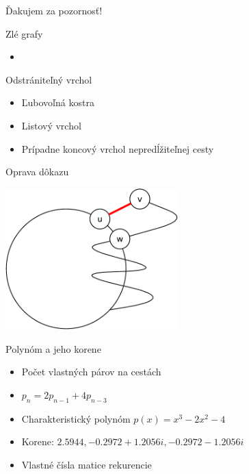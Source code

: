 \documentclass[slovak]{beamer}
\begin{document}
\begin{frame}[plain,c]

\begin{center}
\Huge Ďakujem za pozornosť!
\end{center}

\end{frame}

\appendix

\begin{frame}{Zlé grafy}
    \begin{itemize}
        \item
    \end{itemize}
\end{frame}

\begin{frame}{Odstrániteľný vrchol}
    \begin{itemize}
        \item Ľubovoľná kostra
        \item Listový vrchol
        \item Prípadne koncový vrchol nepredĺžiteľnej cesty
    \end{itemize}
\end{frame}

\begin{frame}{Oprava dôkazu}
    \begin{center}
        \includegraphics[width=0.5\textwidth]{grafy/posledny_krok.pdf}
    \end{center}
\end{frame}

\begin{frame}{Polynóm a jeho korene}
    \begin{itemize}
        \item Počet vlastných párov na cestách
        \item $p_n = 2p_{n-1} + 4p_{n-3}$
        \item Charakteristický polynóm $p(x) = x^3 - 2x^2 - 4$
        \item Korene: $2.5944, -0.2972 + 1.2056i, -0.2972 - 1.2056i$
        \item Vlastné čísla matice rekurencie
    \end{itemize}
\end{frame}
\end{document}
